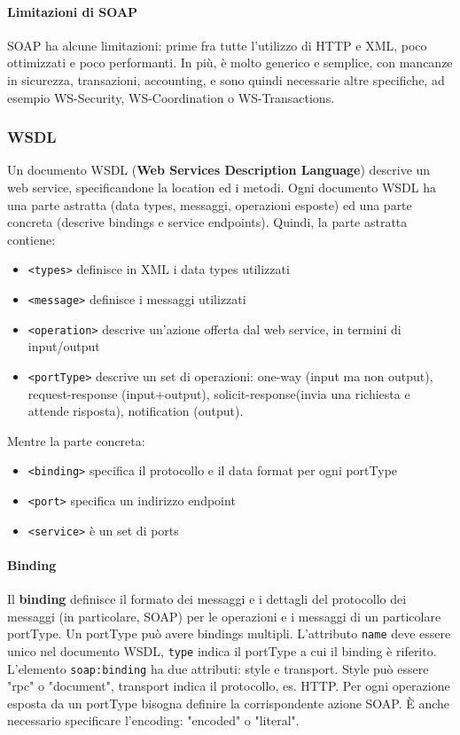 \documentclass[11pt]{article}
\newcommand{\code}[1]{\texttt{#1}}
\begin{document}
\paragraph{Limitazioni di SOAP} SOAP ha alcune limitazioni: prime fra tutte l'utilizzo di HTTP e XML, poco ottimizzati e poco performanti. In più, è molto generico e semplice, con mancanze in sicurezza, transazioni, accounting, e sono quindi necessarie altre specifiche, ad esempio WS-Security, WS-Coordination o WS-Transactions.

\subsubsection{WSDL}
Un documento WSDL (\textbf{Web Services Description Language}) descrive un web service, specificandone la location ed i metodi. Ogni documento WSDL ha una parte astratta (data types, messaggi, operazioni esposte) ed una parte concreta (descrive bindings e service endpoints). Quindi, la parte astratta contiene:
\begin{itemize}
    \item \code{<types>} definisce in XML i data types utilizzati 
    \item \code{<message>} definisce i messaggi utilizzati
    \item \code{<operation>} descrive un'azione offerta dal web service, in termini di input/output 
    \item \code{<portType>} descrive un set di operazioni: one-way (input ma non output), request-response (input+output), solicit-response(invia una richiesta e attende risposta), notification (output). 
\end{itemize}
Mentre la parte concreta:
\begin{itemize}
    \item \code{<binding>} specifica il protocollo e il data format per ogni portType 
    \item \code{<port>} specifica un indirizzo endpoint 
    \item \code{<service>} è un set di ports
\end{itemize}
\paragraph{Binding} Il \textbf{binding} definisce il formato dei messaggi e i dettagli del protocollo dei messaggi (in particolare, SOAP) per le operazioni e i messaggi di un particolare portType. Un portType può avere bindings multipli. L'attributo \code{name} deve essere unico nel documento WSDL, \code{type} indica il portType a cui il binding è riferito. L'elemento \code{soap:binding} ha due attributi: style e transport. Style può essere "rpc" o "document", transport indica il protocollo, es. HTTP. Per ogni operazione esposta da un portType bisogna definire la corrispondente azione SOAP. È anche necessario specificare l'encoding: "encoded" o "literal". 
\end{document}
